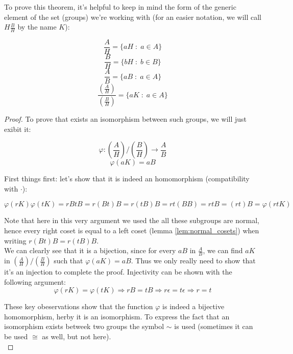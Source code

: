 To prove this theorem, it's helpful to keep in mind the form of the generic element of 
the set (groups) we're working with (for an easier notation, we will call $H\frac{B}{H}$ by 
the name $K$):

$$ \frac{A}{H} = \{ aH \;:\; a \in A \} $$
$$ \frac{B}{H} = \{ bH \;:\; b \in B \} $$
$$ \frac{A}{B} = \{ aB \;:\; a \in A \} $$
$$ \frac{(\frac{A}{H})}{(\frac{B}{H})} = \{ aK \;:\; a \in A \} $$ 
\vspace{0.2em}

\begin{proof}
    To prove that exists an isomorphism between such groups, we will just exibit it:

    $$ \varphi : (\frac{A}{H})/(\frac{B}{H}) \rightarrow \frac{A}{B} $$
    $$ \varphi(aK) = aB $$ \vspace{0.2em}

    First things first: let's show that it is indeed an homomorphism (compatibility with $\cdot$):

    $$ 
        \varphi(rK)\varphi(tK) = 
        rBtB = r(Bt)B = r(tB)B = rt(BB) = rtB = (rt)B = 
        \varphi(rtK)
    $$ \vspace{0.2em}

    Note that here in this very argument we used the all these subgroups are normal, hence 
    every right coset is equal to a left coset (lemma \ref{lem:normal_cosets}) when writing 
    $ r(Bt)B = r(tB)B $. \\


    We can clearly see that it is a bijection, since for every $aB$ in $\frac{A}{B}$, 
    we can find $aK$ in $(\frac{A}{H})/(\frac{B}{H})$ such that $\varphi(aK) = aB$. Thus 
    we only really need to show that it's an injection to complete the proof. Injectivity can 
    be shown with the following argument: \\

    $$ 
        \varphi(rK) = \varphi(tK) \Rightarrow rB = tB \Rightarrow r\epsilon = 
        t\epsilon \Rightarrow r = t 
    $$ \vspace{0.2em}

    These key obeservations show that the function $\varphi$ is indeed a bijective 
    homomorphism, herby it is an isomorphism. To express the fact that an isomorphism exists
    betweek two groups the symbol $\sim$ is used 
    (sometimes it can be used $\cong$ as well, but not here). \\ 

\end{proof} \vspace{0.2em}

\newpage